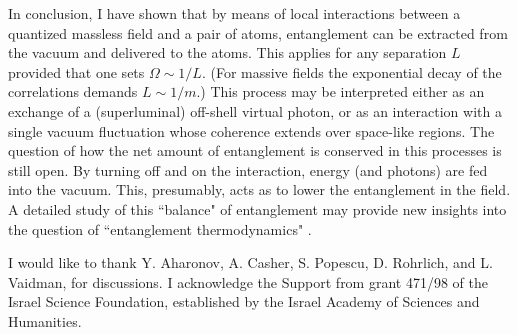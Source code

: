 In conclusion, I have shown that by means of
local interactions between a quantized massless field and a pair of atoms,
entanglement can be extracted from the vacuum
and delivered to the atoms.  This applies for any
separation $L$ provided that one sets  $\Omega\sim 1/L$.
(For massive fields the exponential decay
of the correlations demands $L\sim1/m$.)
This process may be interpreted either as
an exchange of a (superluminal) off-shell virtual
photon, or as an  interaction with a single vacuum
fluctuation whose coherence extends over
space-like regions.
The question of how the net amount of entanglement is
conserved in this processes is still open.
By turning  off and on the interaction,
energy (and photons) are fed into the vacuum. This, presumably,
acts as to lower the entanglement in the field.
A detailed study of this ``balance" of entanglement may provide
new insights into the question of ``entanglement thermodynamics"
\cite{popescu&rohrlich}.


I would like to thank Y. Aharonov, A. Casher, S. Popescu,
D. Rohrlich, and L. Vaidman, for discussions.
I acknowledge the Support from grant 471/98 of the Israel Science Foundation, established by the Israel Academy of Sciences and Humanities.

